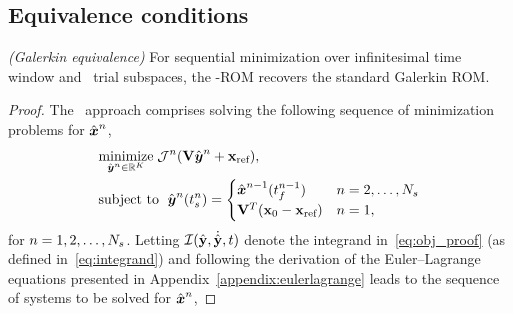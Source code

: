\subsection{Equivalence conditions}
\begin{theorem}\label{theorem:galerkin_equiv}\textit{(Galerkin equivalence)}
For sequential minimization over infinitesimal time window and \spatialAcronym\ trial subspaces, the \methodAcronym-ROM recovers the standard Galerkin ROM.
\end{theorem}
\begin{proof}
The \methodAcronym\ approach comprises solving the following sequence of minimization problems for $\genstateArgnt{n}$,
\begin{equation}\label{eq:obj_proof}
\begin{split}
      & \underset{\genstateyArgnt{n} \in \RR{\romdim}}{\text{minimize}}\; \mathcal{J}^n(\basisspace \genstateyArgnt{n} + \stateIntercept), \\ 
      & \text{subject to }\; \genstateyArg{n}{\timeStartArg{n}} =
\begin{cases} \genstateArg{n-1}{\timeEndArg{n-1}} & n = 2,\ldots,\nslabs \\
\genstateIC & n=1, \end{cases} 
\end{split}
\end{equation}
for $n = 1,2,\ldots,\nslabs$. Letting $\minintegrandArg{n}(\genstateyDiscrete,\dot{\genstateyDiscrete},t)$ denote the integrand in~\eqref{eq:obj_proof} (as defined in~\eqref{eq:integrand}) and following the derivation of the Euler--Lagrange equations presented in Appendix~\ref{appendix:eulerlagrange} leads to the sequence of systems to be solved for $\genstate^n$,


\end{proof}
